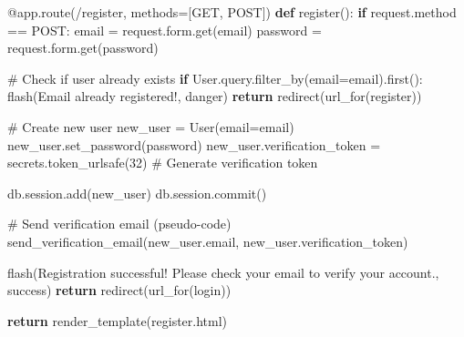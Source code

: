 \documentclass[
  letterpaper,
  DIV=11,
  numbers=noendperiod]{scrreprt}
\newenvironment{Shaded}{\begin{snugshade}}{\end{snugshade}}
\newcommand{\AttributeTok}[1]{\textcolor[rgb]{0.40,0.45,0.13}{#1}}
\newcommand{\CommentTok}[1]{\textcolor[rgb]{0.37,0.37,0.37}{#1}}
\newcommand{\ControlFlowTok}[1]{\textcolor[rgb]{0.00,0.23,0.31}{\textbf{#1}}}
\newcommand{\DecValTok}[1]{\textcolor[rgb]{0.68,0.00,0.00}{#1}}
\newcommand{\KeywordTok}[1]{\textcolor[rgb]{0.00,0.23,0.31}{\textbf{#1}}}
\newcommand{\NormalTok}[1]{\textcolor[rgb]{0.00,0.23,0.31}{#1}}
\newcommand{\OperatorTok}[1]{\textcolor[rgb]{0.37,0.37,0.37}{#1}}
\newcommand{\StringTok}[1]{\textcolor[rgb]{0.13,0.47,0.30}{#1}}
\begin{document}
\begin{Shaded}
\begin{Highlighting}[]
\AttributeTok{@app.route}\NormalTok{(}\StringTok{\textquotesingle{}/register\textquotesingle{}}\NormalTok{, methods}\OperatorTok{=}\NormalTok{[}\StringTok{\textquotesingle{}GET\textquotesingle{}}\NormalTok{, }\StringTok{\textquotesingle{}POST\textquotesingle{}}\NormalTok{])}
\KeywordTok{def}\NormalTok{ register():}
    \ControlFlowTok{if}\NormalTok{ request.method }\OperatorTok{==} \StringTok{\textquotesingle{}POST\textquotesingle{}}\NormalTok{:}
\NormalTok{        email }\OperatorTok{=}\NormalTok{ request.form.get(}\StringTok{\textquotesingle{}email\textquotesingle{}}\NormalTok{)}
\NormalTok{        password }\OperatorTok{=}\NormalTok{ request.form.get(}\StringTok{\textquotesingle{}password\textquotesingle{}}\NormalTok{)}

        \CommentTok{\# Check if user already exists}
        \ControlFlowTok{if}\NormalTok{ User.query.filter\_by(email}\OperatorTok{=}\NormalTok{email).first():}
\NormalTok{            flash(}\StringTok{\textquotesingle{}Email already registered!\textquotesingle{}}\NormalTok{, }\StringTok{\textquotesingle{}danger\textquotesingle{}}\NormalTok{)}
            \ControlFlowTok{return}\NormalTok{ redirect(url\_for(}\StringTok{\textquotesingle{}register\textquotesingle{}}\NormalTok{))}

        \CommentTok{\# Create new user}
\NormalTok{        new\_user }\OperatorTok{=}\NormalTok{ User(email}\OperatorTok{=}\NormalTok{email)}
\NormalTok{        new\_user.set\_password(password)}
\NormalTok{        new\_user.verification\_token }\OperatorTok{=}\NormalTok{ secrets.token\_urlsafe(}\DecValTok{32}\NormalTok{)  }\CommentTok{\# Generate verification token}

\NormalTok{        db.session.add(new\_user)}
\NormalTok{        db.session.commit()}

        \CommentTok{\# Send verification email (pseudo{-}code)}
\NormalTok{        send\_verification\_email(new\_user.email, new\_user.verification\_token)}

\NormalTok{        flash(}\StringTok{\textquotesingle{}Registration successful! Please check your email to verify your account.\textquotesingle{}}\NormalTok{, }\StringTok{\textquotesingle{}success\textquotesingle{}}\NormalTok{)}
        \ControlFlowTok{return}\NormalTok{ redirect(url\_for(}\StringTok{\textquotesingle{}login\textquotesingle{}}\NormalTok{))}

    \ControlFlowTok{return}\NormalTok{ render\_template(}\StringTok{\textquotesingle{}register.html\textquotesingle{}}\NormalTok{)}


\end{Highlighting}
\end{Shaded}
\end{document}
